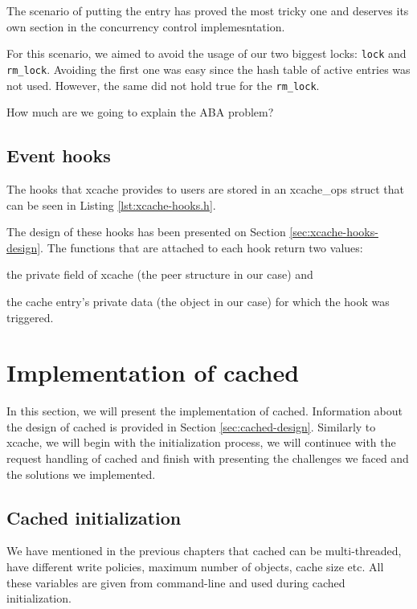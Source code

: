 The scenario of putting the entry has proved the most tricky one and deserves 
its own section in the concurrency control implemesntation.

For this scenario, we aimed to avoid the usage of our two biggest locks: 
\texttt{lock} and \texttt{rm\_lock}. Avoiding the first one was easy since the 
hash table of active entries was not used. However, the same did not hold true 
for the \texttt{rm\_lock}.

\fixme How much are we going to explain the ABA problem?

\subsection{Event hooks}

The hooks that xcache provides to users are stored in an xcache\_ops struct 
that can be seen in Listing \ref{lst:xcache-hooks.h}.


The design of these hooks has been presented on Section 
\ref{sec:xcache-hooks-design}. The functions that are attached to each hook 
return two values:
\begin{inparaenum}
\item the private field of xcache (the peer structure in our case) and
\item the cache entry's private data (the object in our case) for which the 
	hook was triggered.
\end{inparaenum}

\section{Implementation of cached}\label{sec:cached-imp}

In this section, we will present the implementation of cached. Information 
about the design of cached is provided in Section \ref{sec:cached-design}.  
Similarly to xcache, we will begin with the initialization process, we will 
continuee with the request handling of cached and finish with presenting the 
challenges we faced and the solutions we implemented.

\subsection{Cached initialization}\label{sec:cached-init-imp}

We have mentioned in the previous chapters that cached can be multi-threaded, 
have different write policies, maximum number of objects, cache size etc. All 
these variables are given from command-line and used during cached 
initialization.

